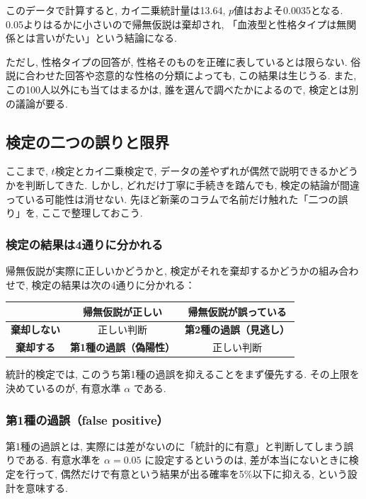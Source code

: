     このデータで計算すると, カイ二乗統計量は13.64, $p$値はおよそ0.0035となる.
    0.05よりはるかに小さいので帰無仮説は棄却され, 「血液型と性格タイプは無関係とは言いがたい」という結論になる.

    ただし, 性格タイプの回答が, 性格そのものを正確に表しているとは限らない.
    俗説に合わせた回答や恣意的な性格の分類によっても, この結果は生じうる.
    また, この100人以外にも当てはまるかは, 誰を選んで調べたかによるので, 検定とは別の議論が要る.


  \subsection{検定の二つの誤りと限界}

    ここまで, $t$検定とカイ二乗検定で, データの差やずれが偶然で説明できるかどうかを判断してきた.
    しかし, どれだけ丁寧に手続きを踏んでも, 検定の結論が間違っている可能性は消せない.
    先ほど新薬のコラムで名前だけ触れた「二つの誤り」を, ここで整理しておこう.

    \subsubsection*{検定の結果は4通りに分かれる}

    帰無仮説が実際に正しいかどうかと, 検定がそれを棄却するかどうかの組み合わせで, 検定の結果は次の4通りに分かれる：

    \begin{center}
      \begin{tabular}{c|cc}
            & \textbf{帰無仮説が正しい} & \textbf{帰無仮説が誤っている} \\
      \hline
      \textbf{棄却しない} & 正しい判断 & \textbf{第2種の過誤（見逃し）} \\
      \textbf{棄却する}   & \textbf{第1種の過誤（偽陽性）} & 正しい判断 \\
      \end{tabular}
    \end{center}

    統計的検定では, このうち第1種の過誤を抑えることをまず優先する.
    その上限を決めているのが, 有意水準 $\alpha$ である.

    \subsubsection*{第1種の過誤（false positive）}

    第1種の過誤とは, 実際には差がないのに「統計的に有意」と判断してしまう誤りである.
    有意水準を $\alpha = 0.05$ に設定するというのは, 差が本当にないときに検定を行って, 偶然だけで有意という結果が出る確率を5\%以下に抑える, という設計を意味する.


